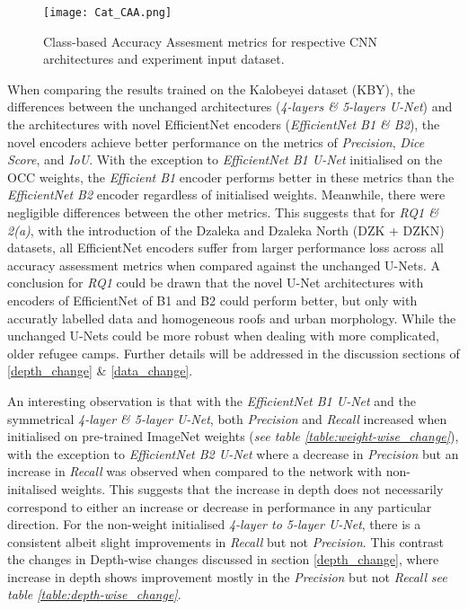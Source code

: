 \documentclass[11pt, a4paper, twoside]{report}
\begin{document}
\begin{landscape}
\begin{figure}[H]
  \centering
  \texttt{[image: Cat\_CAA.png]}
  \caption{Class-based Accuracy Assesment metrics for respective CNN architectures and experiment input dataset.}
  \label{fig:Cat_CAA}
\end{figure}
\end{landscape}

\newpage

When comparing the results trained on the Kalobeyei dataset (KBY), the differences between the unchanged architectures (\textit{4-layers \& 5-layers U-Net}) and the architectures with novel EfficientNet encoders (\textit{EfficientNet B1 \& B2}), the novel encoders achieve better performance on the metrics of \textit{Precision}, \textit{Dice Score}, and \textit{IoU}. With the exception to \textit{EfficientNet B1 U-Net} initialised on the OCC weights, the \textit{Efficient B1} encoder performs better in these metrics than the \textit{EfficientNet B2} encoder regardless of initialised weights. Meanwhile, there were negligible differences between the other metrics. This suggests that for \textit{RQ1 \& 2(a)}, with the introduction of the Dzaleka and Dzaleka North (DZK + DZKN) datasets, all EfficientNet encoders suffer from larger performance loss across all accuracy assessment metrics when compared against the unchanged U-Nets. A conclusion for \textit{RQ1} could be drawn that the novel U-Net architectures with encoders of EfficientNet of B1 and B2 could perform better, but only with accuratly labelled data and homogeneous roofs and urban morphology. While the unchanged U-Nets could be more robust when dealing with more complicated, older refugee camps. Further details will be addressed in the discussion sections of \ref{depth_change} \& \ref{data_change}.\\\par

An interesting observation is that with the \textit{EfficientNet B1 U-Net} and the symmetrical \textit{4-layer \& 5-layer U-Net}, both \textit{Precision} and \textit{Recall} increased when initialised on pre-trained ImageNet weights (\textit{see table \ref{table:weight-wise_change}}), with the exception to \textit{EfficientNet B2 U-Net} where a decrease in \textit{Precision} but an increase in \textit{Recall} was observed when compared to the network with non-initalised weights. This suggests that the increase in depth does not necessarily correspond to either an increase or decrease in performance in any particular direction. For the non-weight initialised \textit{4-layer to 5-layer U-Net}, there is a consistent albeit slight improvements in \textit{Recall} but not \textit{Precision}. This contrast the changes in Depth-wise changes discussed in section \ref{depth_change}, where increase in depth shows improvement mostly in the \textit{Precision} but not \textit{Recall} \textit{see table \ref{table:depth-wise_change}}.\\\par
\end{document}
